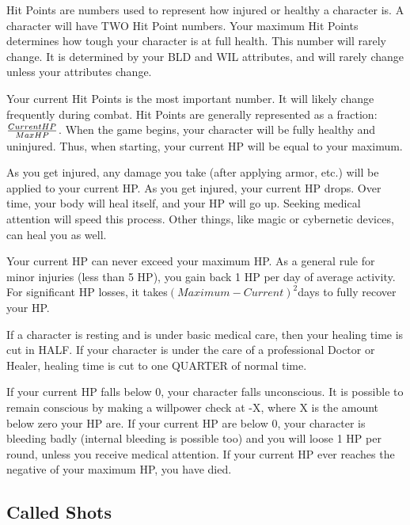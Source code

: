 \documentclass[twoside]{book}
\begin{document}
    {  
    Hit Points are numbers used to represent how injured or healthy a character is. A character will have TWO Hit Point numbers. Your maximum Hit Points determines how tough your character is at full health. This number will rarely change. It is determined by your BLD and WIL attributes, and will rarely change unless your attributes change.
    }
  
    {  
    Your current Hit Points is the most important number. It will likely change frequently during combat. Hit Points are generally represented as a fraction:\begin{math}{{Current HP}\over{Max HP}}\end{math}. When the game begins, your character will be fully healthy and uninjured. Thus, when starting, your current HP will be equal to your maximum.
    }
  
    {  
    As you get injured, any damage you take (after applying armor, etc.) will be applied to your current HP. As you get injured, your current HP drops. Over time, your body will heal itself, and your HP will go up. Seeking medical attention will speed this process. Other things, like magic or cybernetic devices, can heal you as well.
    }
  
    {  
    Your current HP can never exceed your maximum HP. As a general rule for minor injuries (less than 5 HP), you gain back 1 HP per day of average activity. For significant HP losses, it takes\begin{math}{(Maximum-Current)}^{2}\end{math}days to fully recover your HP.
    }
  
    {  
    If a character is resting and is under basic medical care, then your healing time is cut in HALF. If your character is under the care of a professional Doctor or Healer, healing time is cut to one QUARTER of normal time.
    }
  
    {  
    If your current HP falls below 0, your character falls unconscious. It is possible to remain conscious by making a willpower check at -X, where X is the amount below zero your HP are. If your current HP are below 0, your character is bleeding badly (internal bleeding is possible too) and you will loose 1 HP per round, unless you receive medical attention. If your current HP ever reaches the negative of your maximum HP, you have died.
    }
  
    

\subsection{Called Shots}
    
\end{document}
